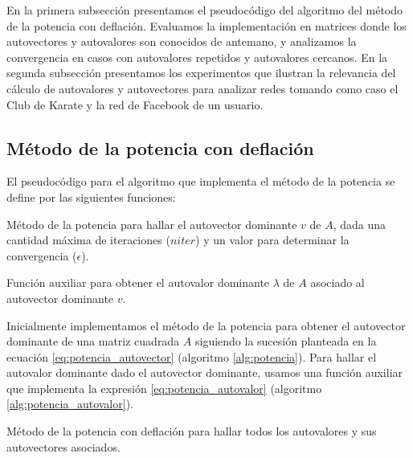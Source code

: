 \documentclass{article}
\begin{document}
En la primera subsección presentamos el pseudocódigo del algoritmo del método de la potencia con deflación. Evaluamos la implementación en matrices donde los autovectores y autovalores son conocidos de antemano, y analizamos la convergencia en casos con autovalores repetidos y autovalores cercanos. En la segunda subsección presentamos los experimentos que ilustran la relevancia del cálculo de autovalores y autovectores para analizar redes tomando como caso el Club de Karate y la red de Facebook de un usuario. 


\subsection{Método de la potencia con deflación} \label{sec:algoritmos}

El pseudocódigo para el algoritmo que implementa el método de la potencia se define por las siguientes funciones:

\begin{algorithm}[!ht]
\caption{
    Método de la potencia para hallar el autovector dominante $v$ de $A$, dada una cantidad máxima de iteraciones ($niter$) y un valor para determinar la convergencia ($\epsilon$).
} 
\label{alg:potencia}
\begin{algorithmic}
 
\end{algorithmic}
\end{algorithm}


\begin{algorithm}[!ht]
\caption{
    Función auxiliar para obtener el autovalor dominante $\lambda$ de $A$ asociado al autovector dominante $v$.
} 
\label{alg:potencia_autovalor}
\begin{algorithmic}
 
\end{algorithmic}
\end{algorithm}

Inicialmente implementamos el método de la potencia para obtener el autovector dominante de una matriz cuadrada $A$ siguiendo la sucesión planteada en la ecuación \ref{eq:potencia_autovector} (algoritmo \ref{alg:potencia}). Para hallar el autovalor dominante dado el autovector dominante, usamos una función auxiliar que implementa la expresión \ref{eq:potencia_autovalor} (algoritmo \ref{alg:potencia_autovalor}). 


\begin{algorithm}[!ht]
\caption{
    Método de la potencia con deflación para hallar todos los autovalores y sus autovectores asociados.
} 
\label{alg:potencia_deflacion}
\begin{algorithmic}
 
\end{algorithmic}
\end{algorithm}
\end{document}
